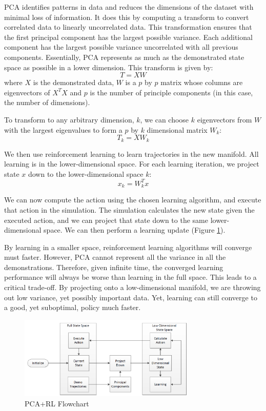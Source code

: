 \documentclass[twoside,11pt]{article}
\begin{document}
PCA identifies patterns in data and reduces the dimensions of the dataset with minimal loss of information. It does this by computing a transform to convert correlated data to linearly uncorrelated data. This transformation ensures that the first principal component has the largest possible variance. Each additional component has the largest possible variance uncorrelated with all previous components. Essentially, PCA represents as much as the demonstrated state space as possible in a lower dimension. This transform is given by:
\begin{equation}
T = XW
\end{equation}
where $X$ is the demonstrated data, $W$ is a $p$ by $p$ matrix whose columns are eigenvectors of $X^TX$ and $p$ is the number of principle components (in this case, the number of dimensions). 

To transform to any arbitrary dimension, $k$, we can choose $k$ eigenvectors from $W$ with the largest eigenvalues to form a $p$ by $k$ dimensional matrix $W_k$:
\begin{equation}
T_k = XW_k
\end{equation}
 
We then use reinforcement learning to learn trajectories in the new manifold. All learning is in the lower-dimensional space. For each learning iteration, we project state $x$ down to the lower-dimensional space $k$:
\begin{equation}
x_k = W^T_kx
\end{equation}

We can now compute the action using the chosen learning algorithm, and execute that action in the simulation. The simulation calculates the new state given the executed action, and we can project that state down to the same lower-dimensional space.  We can then perform a learning update (Figure \ref{fig:flowchart}). 

By learning in a smaller space, reinforcement learning algorithms will converge must faster. However, PCA cannot represent all the variance in all the demonstrations. Therefore, given infinite time, the converged learning performance will always be worse than learning in the full space. This leads to a critical trade-off. By projecting onto a low-dimensional manifold, we are throwing out low variance, yet possibly important data. Yet, learning can still converge to a good, yet suboptimal, policy much faster.

\begin{figure}[h!]
  \centering
      \includegraphics[width=0.75\textwidth]{Flowchart}
  \caption{PCA+RL Flowchart}
  \label{fig:flowchart}
\end{figure}
\end{document}
